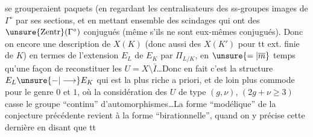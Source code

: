 se grouperaient    paquets (en regardant les centralisateurs des ss-groupes images de $\Gamma^\circ$ par ses sections,\deleted{)} et en mettant ensemble des scindages qui ont des $\unsure{\mathrm{Zentr}}(\Gamma^\circ)$ conjugués (même s'ils ne sont eux-mêmes conjugués). Donc on  encore une description de $X(K)$ (donc aussi des $X(K')$ pour tt ext. finie  de $K$) en termes de l'extension $E_L$ de $E_K$ par $\Pi_{L/K}$, en $\unsure{=|\overline m}$ temps qu'une façon de reconstituer les $U=X\setminus\bar I$\ldots Donc en fait c'est la structure $E_L\unsure{-|\longrightarrow}E_K$ qui est la plus riche a priori, et de loin plus commode pour le genre $0$ et $1$, où la considération des $U$ de type $(g,\nu)$, $(2g+\nu\geq3)$ casse le groupe ``continu'' d'automorphismes\ldots La forme ``modélique'' de la conjecture précédente revient à la forme ``birationnelle'', quand on y précise cette dernière en disant que tt
